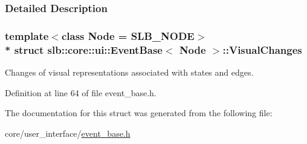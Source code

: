 \subsubsection{Detailed Description}
\subsubsection*{template$<$class Node = S\+L\+B\+\_\+\+N\+O\+DE$>$\\*
struct slb\+::core\+::ui\+::\+Event\+Base$<$ Node $>$\+::\+Visual\+Changes}

Changes of visual representations associated with states and edges. 

Definition at line 64 of file event\+\_\+base.\+h.



The documentation for this struct was generated from the following file\+:\begin{DoxyCompactItemize}
\item 
core/user\+\_\+interface/\hyperlink{event__base_8h}{event\+\_\+base.\+h}\end{DoxyCompactItemize}

